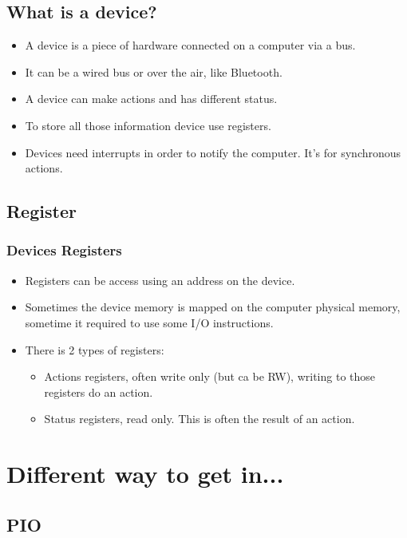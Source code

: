 \subsection{What is a device?}
\begin{frame}
\begin{itemize}
  \item A device is a piece of hardware connected on a computer via a
        bus.
  \item It can be a wired bus or over the air, like Bluetooth.
  \item A device can make actions and has different status.
  \item To store all those information device use registers.
  \item Devices need interrupts in order to notify the computer. It's
  for synchronous actions.
\end{itemize}
\end{frame}
\subsection{Register}
\begin{frame}
\frametitle{Devices Registers}
\begin{itemize}
        \item Registers can be access using an address on the device.
        \item Sometimes the device memory is mapped on the computer physical memory, sometime it required to use some I/O instructions.
        \item There is 2 types of registers:
        \begin{itemize}
          \item Actions registers, often write only (but ca be RW), writing to those registers do an action.
          \item Status registers, read only. This is often the result of an action.
        \end{itemize}
\end{itemize}
\end{frame}


\section{Different way to get in...}
\subsection{PIO}

